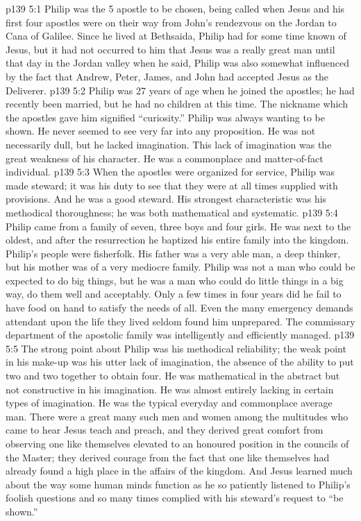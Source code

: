 \vs p139 5:1 Philip was the 5 apostle to be chosen, being called when Jesus and his first four apostles were on their way from John’s rendezvous on the Jordan to Cana of Galilee. Since he lived at Bethsaida, Philip had for some time known of Jesus, but it had not occurred to him that Jesus was a really great man until that day in the Jordan valley when he said,  Philip was also somewhat influenced by the fact that Andrew, Peter, James, and John had accepted Jesus as the Deliverer.
\vs p139 5:2 Philip was 27 years of age when he joined the apostles; he had recently been married, but he had no children at this time. The nickname which the apostles gave him signified “curiosity.” Philip was always wanting to be shown. He never seemed to see very far into any proposition. He was not necessarily dull, but he lacked imagination. This lack of imagination was the great weakness of his character. He was a commonplace and matter\hyp{}of\hyp{}fact individual.
\vs p139 5:3 \pc When the apostles were organized for service, Philip was made steward; it was his duty to see that they were at all times supplied with provisions. And he was a good steward. His strongest characteristic was his methodical thoroughness; he was both mathematical and systematic.
\vs p139 5:4 Philip came from a family of seven, three boys and four girls. He was next to the oldest, and after the resurrection he baptized his entire family into the kingdom. Philip’s people were fisherfolk. His father was a very able man, a deep thinker, but his mother was of a very mediocre family. Philip was not a man who could be expected to do big things, but he was a man who could do little things in a big way, do them well and acceptably. Only a few times in four years did he fail to have food on hand to satisfy the needs of all. Even the many emergency demands attendant upon the life they lived seldom found him unprepared. The commissary department of the apostolic family was intelligently and efficiently managed.
\vs p139 5:5 The strong point about Philip was his methodical reliability; the weak point in his make\hyp{}up was his utter lack of imagination, the absence of the ability to put two and two together to obtain four. He was mathematical in the abstract but not constructive in his imagination. He was almost entirely lacking in certain types of imagination. He was the typical everyday and commonplace average man. There were a great many such men and women among the multitudes who came to hear Jesus teach and preach, and they derived great comfort from observing one like themselves elevated to an honoured position in the councils of the Master; they derived courage from the fact that one like themselves had already found a high place in the affairs of the kingdom. And Jesus learned much about the way some human minds function as he so patiently listened to Philip’s foolish questions and so many times complied with his steward’s request to “be shown.”
